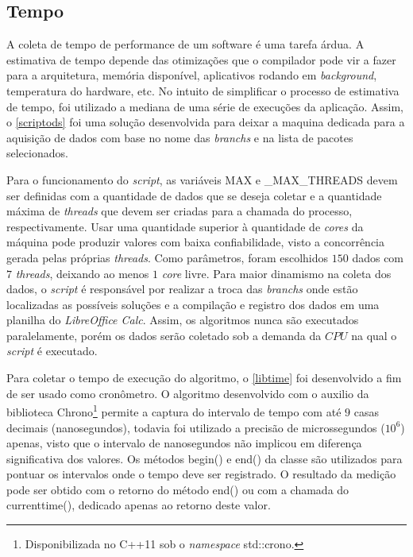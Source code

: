 \subsection*{Tempo} %
\label{sec:tempo}

A coleta de tempo de performance de um software é uma tarefa árdua. A estimativa de tempo depende das otimizações que o compilador pode vir a fazer para a arquitetura, memória disponível, aplicativos rodando em \textit{background}, temperatura do hardware, etc. No intuito de simplificar o processo de estimativa de tempo, foi utilizado a mediana de uma série de execuções da aplicação. Assim, o \autoref{scriptods} foi uma solução desenvolvida para deixar a maquina dedicada para a aquisição de dados com base no nome das \textit{branchs} e na lista de pacotes selecionados.

Para o funcionamento do \textit{script}, as variáveis {\code MAX} e {\code \_MAX\_THREADS} devem ser definidas com a quantidade de dados que se deseja coletar e a quantidade máxima de \textit{threads} que devem ser criadas para a chamada do processo, respectivamente. Usar uma quantidade superior à quantidade de \textit{cores}  da máquina pode produzir valores com baixa confiabilidade, visto a concorrência gerada pelas próprias \textit{threads}. Como parâmetros, foram escolhidos $150$ dados com $7$ \textit{threads}, deixando ao menos $1$ \textit{core} livre. Para maior dinamismo na coleta dos dados, o \textit{script} é responsável por realizar a troca das \textit{branchs} onde estão localizadas as possíveis soluções e a compilação e registro dos dados em uma planilha do \textit{LibreOffice Calc}. Assim, os algoritmos nunca são executados paralelamente, porém os dados serão coletado sob a demanda da $CPU$ na qual o \textit{script} é executado.

Para coletar o tempo de execução do algoritmo, o \autoref{libtime} foi desenvolvido a fim de ser usado como cronômetro. O algoritmo desenvolvido com o auxilio da biblioteca {\code Chrono}\footnote{Disponibilizada no {\code C++11} sob o \textit{namespace} {\code std::crono}.} permite a captura do intervalo de tempo com até $9$ casas decimais (nanosegundos), todavia foi utilizado a precisão de microssegundos ($10^ 6$) apenas, visto que o intervalo de nanosegundos não implicou em diferença significativa dos valores. Os métodos {\code begin()} e {\code end()} da classe são utilizados para pontuar os intervalos onde o tempo deve ser registrado. O resultado da medição pode ser obtido com o retorno do método {\code end()} ou com a chamada do {\code currenttime()}, dedicado apenas ao retorno deste valor.

